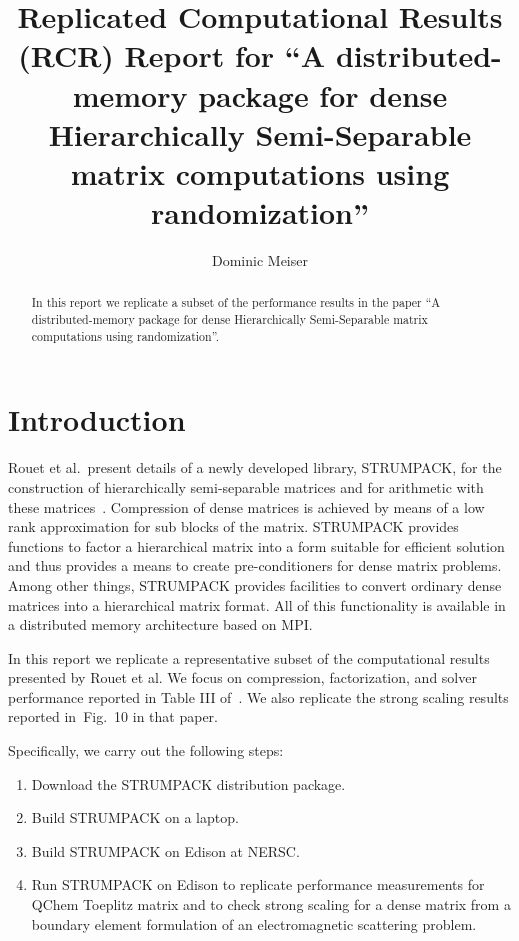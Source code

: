 \documentclass{acmsmall}
\begin{document}
\title{Replicated Computational Results (RCR) Report for
  ``A distributed-memory package for dense Hierarchically
    Semi-Separable matrix computations using randomization''}

\author{Dominic Meiser
}

\newcommand{\strumpack}{STRUMPACK}

\begin{abstract}
  In this report we replicate a subset of the performance results
  in the paper ``A distributed-memory package for dense
  Hierarchically Semi-Separable matrix computations using
  randomization''.
\end{abstract}

\maketitle 

\section{Introduction}

Rouet et al.\ present details of a newly developed library,
\strumpack{}, for the construction of hierarchically semi-separable
matrices and for arithmetic with these matrices~\cite{rouet:strumpack}.
Compression of dense matrices is achieved by means of a low rank
approximation for sub blocks of the matrix.  \strumpack{} provides
functions to factor a hierarchical matrix into a form suitable for
efficient solution and thus provides a means to create pre-conditioners
for dense matrix problems.  Among other things, \strumpack{} provides
facilities to convert ordinary dense matrices into a hierarchical matrix
format.  All of this functionality is available in a distributed memory
architecture based on MPI.

In this report we replicate a representative subset of the
computational results presented by Rouet et al.  We focus on
compression, factorization, and solver performance reported in
Table III of~\cite{rouet:strumpack}.  We also replicate the
strong scaling results reported in~Fig.~10
in that paper.

Specifically, we carry out the following steps:
\begin{enumerate}
  \item Download the \strumpack{} distribution package.
  \item Build \strumpack{} on a laptop.
  \item Build \strumpack{} on Edison at NERSC.
  \item Run \strumpack{} on Edison to replicate performance
    measurements for QChem Toeplitz matrix and to check strong
    scaling for a dense matrix from a boundary element formulation
    of an electromagnetic scattering problem.
\end{enumerate}
\end{document}
